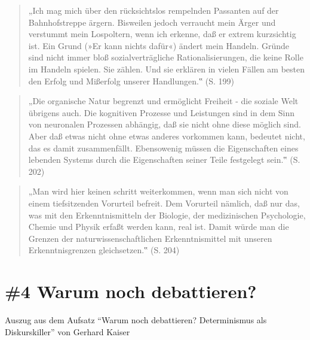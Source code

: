 \documentclass[
  a4paper,
]{report}
\begin{document}
\begin{quote}
„Ich mag mich über den rücksichtslos rempelnden Passanten auf der Bahnhofstreppe ärgern. Bisweilen jedoch verraucht mein Ärger und verstummt mein Lospoltern, wenn ich erkenne, daß er extrem kurzsichtig ist. Ein Grund (»Er kann nichts dafür«) ändert mein Handeln. Gründe sind nicht immer bloß sozialverträgliche Rationalisierungen, die keine Rolle im Handeln spielen. Sie zählen. Und sie erklären in vielen Fällen am besten den Erfolg und Mißerfolg unserer Handlungen.‟ (S. 199)
\end{quote}

\begin{quote}
„Die organische Natur begrenzt und ermöglicht Freiheit - die soziale Welt übrigens auch. Die kognitiven Prozesse und Leistungen sind in dem Sinn von neuronalen Prozessen abhängig, daß sie nicht ohne diese möglich sind. Aber daß etwas nicht ohne etwas anderes vorkommen kann, bedeutet nicht, das es damit zusammenfällt. Ebensowenig müssen die Eigenschaften eines lebenden Systems durch die Eigenschaften seiner Teile festgelegt sein.‟ (S. 202)
\end{quote}

\begin{quote}
„Man wird hier keinen schritt weiterkommen, wenn man sich nicht von einem tiefsitzenden Vorurteil befreit. Dem Vorurteil nämlich, daß nur das, was mit den Erkenntnismitteln der Biologie, der medizinischen Psychologie, Chemie und Physik erfaßt werden kann, real ist. Damit würde man die Grenzen der naturwissenschaftlichen Erkenntnismittel mit unseren Erkenntnisgrenzen gleichsetzen.‟ (S. 204)
\end{quote}

\hypertarget{pr-ev4}{%
\section{\#4 Warum noch debattieren?}\label{pr-ev4}}

Auszug aus dem Aufsatz ``Warum noch debattieren? Determinismus als Diskurskiller'' von Gerhard Kaiser \citeyearpar{Kaiser2004}
\end{document}
